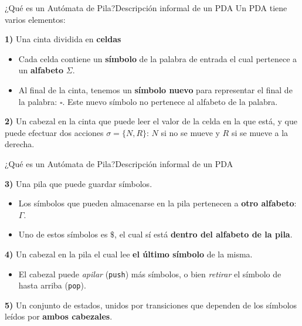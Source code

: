 \documentclass[spanish]{beamer}
\begin{document}
\begin{frame}{¿Qué es un Autómata de Pila?}{Descripción informal de un PDA}
    Un PDA tiene varios elementos:
    \bigskip

    \textbf{1)} Una \alert{cinta} dividida en \textbf{celdas} \pause
    
    \begin{itemize}
        \item Cada celda contiene un \textbf{símbolo} de la palabra de entrada el cual pertenece a un \textbf{alfabeto} $\Sigma$. \pause
        \item  Al final de la cinta, tenemos un \textbf{símbolo nuevo} para representar el \alert{final de la palabra}: $\square$. Este nuevo símbolo no pertenece al alfabeto de la palabra. \pause
    \end{itemize}

    \textbf{2)} Un \alert{cabezal en la cinta} que puede leer el valor de la celda en la que está, y que puede efectuar dos acciones $\sigma = \{N,R\}$: $N$ si no se mueve y $R$ si se mueve a la derecha. \pause

    \begin{center}
    \end{center}
\end{frame}

\begin{frame}{¿Qué es un Autómata de Pila?}{Descripción informal de un PDA}

    \textbf{3)} Una \alert{pila} que puede guardar símbolos. \pause

    \begin{itemize}
        \item Los símbolos que pueden almacenarse en la pila pertenecen a \textbf{otro alfabeto}: $\Gamma$. \pause
        \item Uno de estos símbolos es $\$$, el cual sí está \textbf{dentro del alfabeto de la pila}. \pause
    \end{itemize}

    \bigskip

    \textbf{4)} Un \alert{cabezal en la pila} el cual lee \textbf{el último símbolo} de la misma. \pause

    \begin{itemize}
        \item El cabezal puede \textit{apilar} (\alert{\texttt{push}}) más símbolos, o bien \textit{retirar} el símbolo de hasta arriba (\alert{\texttt{pop}}). \pause
    \end{itemize}

    \bigskip

    \textbf{5)} Un conjunto de \alert{estados}, unidos por \alert{transiciones} que dependen de los símbolos leídos por \textbf{ambos cabezales}.

\end{frame}
\end{document}
